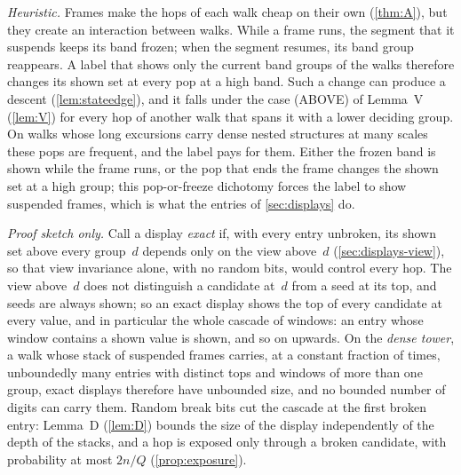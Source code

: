\begin{remark}\label{rem:popfreeze}
\emph{Heuristic.} Frames make the hops of each walk cheap on their own (\cref{thm:A}), but they create an interaction between
walks. While a frame runs, the segment that it suspends keeps its band frozen; when the segment resumes, its band group
reappears. A label that shows only the current band groups of the walks therefore changes its shown set at every pop at a high
band. Such a change can produce a descent (\cref{lem:stateedge}), and it falls under the case (ABOVE) of Lemma~V (\cref{lem:V})
for every hop of another walk that spans it with a lower deciding group. On walks whose long excursions carry dense nested
structures at many scales these pops are frequent, and the label pays for them. Either the frozen band is shown while the frame
runs, or the pop that ends the frame changes the shown set at a high group; this pop-or-freeze dichotomy forces the label to show
suspended frames, which is what the entries of \cref{sec:displays} do.
\end{remark}

\begin{remark}\label{rem:exact}
\emph{Proof sketch only.} Call a display \emph{exact} if, with every entry unbroken, its shown set above every group~$d$ depends
only on the view above~$d$ (\cref{sec:displays-view}), so that view invariance alone, with no random bits, would control every
hop. The view above~$d$ does not distinguish a candidate at~$d$ from a seed at its top, and seeds are always shown; so an exact
display shows the top of every candidate at every value, and in particular the whole cascade of windows: an entry whose window
contains a shown value is shown, and so on upwards. On the \emph{dense tower}, a walk whose stack of suspended frames carries,
at a constant fraction of times, unboundedly many entries with distinct tops and windows of more than one group, exact displays
therefore have unbounded size, and no bounded number of digits can carry them. Random break bits cut the cascade at the first
broken entry: Lemma~D (\cref{lem:D}) bounds the size of the display independently of the depth of the stacks, and a hop is
exposed only through a broken candidate, with probability at most $2n/Q$ (\cref{prop:exposure}).
\end{remark}


